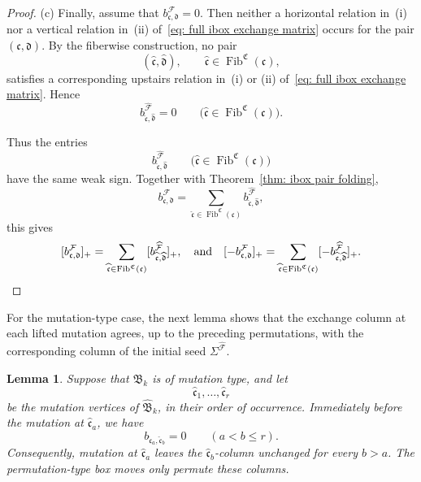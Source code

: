 \documentclass[12pt, leqno]{amsart}
\numberwithin{equation}{section}
\theoremstyle{plain}
\newtheorem{lemma}{Lemma}[section]
\theoremstyle{definition}
\renewcommand{\le}{\leqslant}
\newcommand{\Fib}{\operatorname{Fib}}
\newcommand{\frakB}{\mathfrak{B}}
\newcommand{\frakC}{\mathfrak{C}}
\newcommand{\frakc}{\mathfrak{c}}
\newcommand{\frakd}{\mathfrak{d}}
\newcommand{\hfrakc}{\widehat{\frakc}}
\newcommand{\hfrakd}{\widehat{\frakd}}
\newcommand{\calF}{\mathcal{F}}
\newcommand{\hcalF}{{\widehat{\calF}}}
\newcommand{\hfrakB}{\widehat{\frakB}}
\begin{document}
\begin{proof}
\noindent
{\rm (c)} Finally, assume that
$b^\calF_{\frakc,\frakd}=0$.
Then neither a horizontal relation in~{\rm (i)} nor a vertical
relation in~{\rm (ii)} of~\eqref{eq: full ibox exchange matrix}
occurs for the pair $(\frakc,\frakd)$. By the fiberwise construction,
no pair
\[
(\hfrakc,\hfrakd), \qquad \hfrakc\in\Fib^{\frakC}(\frakc),
\]
satisfies a corresponding upstairs relation in~{\rm (i)} or
{\rm (ii)} of~\eqref{eq: full ibox exchange matrix}. Hence
\[
b^\hcalF_{\hfrakc,\hfrakd}=0 \qquad \bigl(\hfrakc\in\Fib^{\frakC}(\frakc)\bigr).
\]

Thus the entries
\[
b^\hcalF_{\hfrakc,\hfrakd} \qquad \bigl(\hfrakc\in\Fib^{\frakC}(\frakc)\bigr)
\]
have the same weak sign. Together with
Theorem~\ref{thm: ibox pair folding},
\[
b^\calF_{\frakc,\frakd} = \sum_{\hfrakc\in\Fib^{\frakC}(\frakc)} b^\hcalF_{\hfrakc,\hfrakd},
\]
this gives
\[
[b^\calF_{\frakc,\frakd}]_+ = \sum_{\hfrakc\in\Fib^{\frakC}(\frakc)} [b^\hcalF_{\hfrakc,\hfrakd}]_+,
\quad\text{and}\quad
[-b^\calF_{\frakc,\frakd}]_+ = \sum_{\hfrakc\in\Fib^{\frakC}(\frakc)}  [-b^\hcalF_{\hfrakc,\hfrakd}]_+. \qedhere
\]
\end{proof}

 For the mutation-type case, the next lemma shows that the exchange column at each lifted mutation
agrees, up to the preceding permutations, with the corresponding
column of the initial seed $\Sigma^\hcalF$.{}

\begin{lemma}\label{lem: future mutation column}
Suppose that $\frakB_k$ is of mutation type, and let
\[
\hfrakc_1,\ldots,\hfrakc_r
\]
be the mutation vertices of $\hfrakB_k$, in their order of
occurrence. Immediately before the mutation at $\hfrakc_a$, we have
\[
b_{\hfrakc_a,\hfrakc_b}=0 \qquad (a<b\le r).
\]
 Consequently, mutation at $\hfrakc_a$ leaves the
$\hfrakc_b$-column unchanged for every $b>a$.{} The
permutation-type box moves only permute these columns.
\end{lemma}
\end{document}
